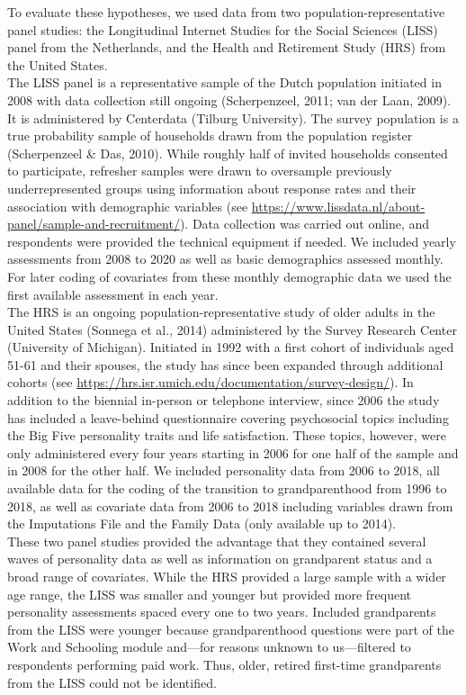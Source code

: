 \documentclass[
  english,
  man, noextraspace,floatsintext]{apa7}
\begin{document}
To evaluate these hypotheses, we used data from two population-representative panel studies: the Longitudinal Internet Studies for the Social Sciences (LISS) panel from the Netherlands, and the Health and Retirement Study (HRS) from the United States.\\
The LISS panel is a representative sample of the Dutch population initiated in 2008 with data collection still ongoing (Scherpenzeel, 2011; van der Laan, 2009). It is administered by Centerdata (Tilburg University). The survey population is a true probability sample of households drawn from the population register (Scherpenzeel \& Das, 2010). While roughly half of invited households consented to participate, refresher samples were drawn to oversample previously underrepresented groups using information about response rates and their association with demographic variables (see \url{https://www.lissdata.nl/about-panel/sample-and-recruitment/}). Data collection was carried out online, and respondents were provided the technical equipment if needed. We included yearly assessments from 2008 to 2020 as well as basic demographics assessed monthly. For later coding of covariates from these monthly demographic data we used the first available assessment in each year.\\
The HRS is an ongoing population-representative study of older adults in the United States (Sonnega et al., 2014) administered by the Survey Research Center (University of Michigan). Initiated in 1992 with a first cohort of individuals aged 51-61 and their spouses, the study has since been expanded through additional cohorts (see \url{https://hrs.isr.umich.edu/documentation/survey-design/}). In addition to the biennial in-person or telephone interview, since 2006 the study has included a leave-behind questionnaire covering psychosocial topics including the Big Five personality traits and life satisfaction. These topics, however, were only administered every four years starting in 2006 for one half of the sample and in 2008 for the other half. We included personality data from 2006 to 2018, all available data for the coding of the transition to grandparenthood from 1996 to 2018, as well as covariate data from 2006 to 2018 including variables drawn from the Imputations File and the Family Data (only available up to 2014).\\
These two panel studies provided the advantage that they contained several waves of personality data as well as information on grandparent status and a broad range of covariates. While the HRS provided a large sample with a wider age range, the LISS was smaller and younger but provided more frequent personality assessments spaced every one to two years. Included grandparents from the LISS were younger because grandparenthood questions were part of the Work and Schooling module and---for reasons unknown to us---filtered to respondents performing paid work. Thus, older, retired first-time grandparents from the LISS could not be identified.
\end{document}
